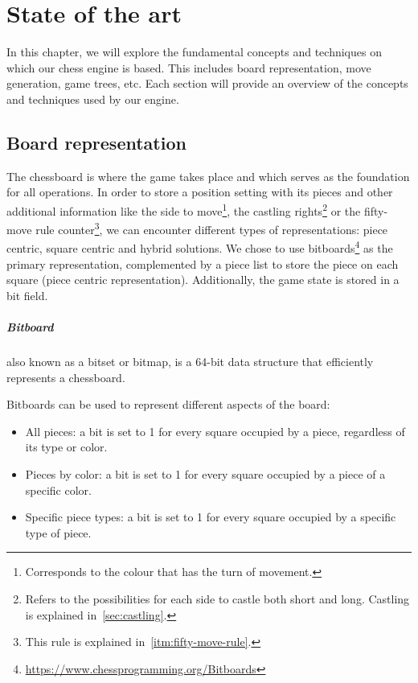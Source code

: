 \chapter{State of the art}
\label{cap:estadoDeLaCuestion}

In this chapter, we will explore the fundamental concepts and techniques on which our chess engine is based. This includes board representation, move generation, game trees, etc. Each section will provide an overview of the concepts and techniques used by our engine.

\section{Board representation}

The chessboard is where the game takes place and which serves as the foundation for all operations. In order to store a position setting with its pieces and other additional information like the side to move\footnote{Corresponds to the colour that has the turn of movement.}, the castling rights\footnote{Refers to the possibilities for each side to castle both short and long. Castling is explained in~\ref{sec:castling}.} or the fifty-move rule counter\footnote{This rule is explained in~\ref{itm:fifty-move-rule}.}, we can encounter different types of representations: piece centric, square centric and hybrid solutions. We chose to use bitboards\footnote{\url{https://www.chessprogramming.org/Bitboards}} as the primary representation, complemented by a piece list to store the piece on each square (piece centric representation). Additionally, the game state is stored in a bit field.

\paragraph{Bitboard} also known as a bitset or bitmap, is a 64-bit data structure that efficiently represents a chessboard.

\vspace{1em}

\noindent Bitboards can be used to represent different aspects of the board:

\begin{itemize}
    \item All pieces: a bit is set to 1 for every square occupied by a piece, regardless of its type or color.
    \item Pieces by color: a bit is set to 1 for every square occupied by a piece of a specific color. 
    \item Specific piece types: a bit is set to 1 for every square occupied by a specific type of piece.
\end{itemize}

